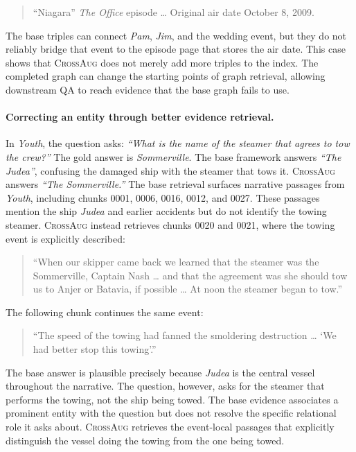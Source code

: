 \documentclass[11pt]{article}
\newcommand{\ours}{\textsc{CrossAug}\xspace}
\begin{document}
\begin{quote}
\small
``Niagara'' \textit{The Office} episode \ldots{} Original air date October 8, 2009.
\end{quote}

The base triples can connect \textit{Pam}, \textit{Jim}, and the wedding event, but they do not reliably bridge that event to the episode page that stores the air date. This case shows that \ours does not merely add more triples to the index. The completed graph can change the starting points of graph retrieval, allowing downstream QA to reach evidence that the base graph fails to use.

\paragraph{Correcting an entity through better evidence retrieval.}
In \textit{Youth}, the question asks: \textit{``What is the name of the steamer that agrees to tow the crew?''} The gold answer is \textit{Sommerville}. The base framework answers \textit{``The Judea''}, confusing the damaged ship with the steamer that tows it. \ours answers \textit{``The Sommerville.''} The base retrieval surfaces narrative passages from \textit{Youth}, including chunks 0001, 0006, 0016, 0012, and 0027. These passages mention the ship \textit{Judea} and earlier accidents but do not identify the towing steamer. \ours instead retrieves chunks 0020 and 0021, where the towing event is explicitly described:

\begin{quote}
\small
``When our skipper came back we learned that the steamer was the Sommerville, Captain Nash \ldots{} and that the agreement was she should tow us to Anjer or Batavia, if possible \ldots{} At noon the steamer began to tow.''
\end{quote}

The following chunk continues the same event:

\begin{quote}
\small
``The speed of the towing had fanned the smoldering destruction \ldots{} `We had better stop this towing'.''
\end{quote}

The base answer is plausible precisely because \textit{Judea} is the central vessel throughout the narrative. The question, however, asks for the steamer that performs the towing, not the ship being towed. The base evidence associates a prominent entity with the question but does not resolve the specific relational role it asks about. \ours retrieves the event-local passages that explicitly distinguish the vessel doing the towing from the one being towed.
\end{document}
